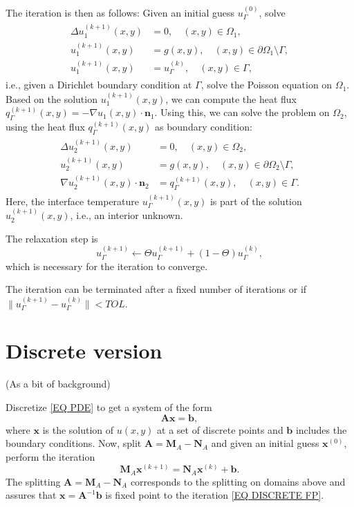 \documentclass[a4paper,10pt]{article}
\begin{document}
The iteration is then as follows: Given an initial guess $u_\Gamma^{(0)}$, solve
% 
\begin{align}
\begin{split}
\Delta u_1^{(k+1)} (x, y) &= 0, \quad (x, y) \in \Omega_1,\\
u^{(k+1)}_1(x, y) &= g(x, y), \quad (x, y) \in \partial \Omega_1\setminus \Gamma, \\
u^{(k+1)}_1(x, y) & = u_\Gamma^{(k)}, \quad (x,y) \in \Gamma,
\end{split}
\end{align}
% 
i.e., given a Dirichlet boundary condition at $\Gamma$, solve the Poisson equation on $\Omega_1$. Based on the solution $u_1^{(k+1)}(x,y)$, we can compute the heat flux $q_\Gamma^{(k+1)}(x, y) = -\nabla u_1 (x, y) \cdot \bm{n}_1$. Using this, we can solve the problem on $\Omega_2$, using the heat flux $q_\Gamma^{(k+1)}(x, y)$ as boundary condition:
% 
\begin{align}
\begin{split}
\Delta u_2^{(k+1)} (x, y) &= 0, \quad (x, y) \in \Omega_2,\\
u^{(k+1)}_2(x, y) &= g(x, y), \quad (x, y) \in \partial \Omega_2\setminus \Gamma, \\
\nabla u^{(k+1)}_2(x, y) \cdot \bm{n}_2 & = q_\Gamma^{(k+1)}(x, y), \quad (x,y) \in \Gamma.
\end{split}
\end{align}
% 
Here, the interface temperature $u_\Gamma^{(k+1)}(x, y)$ is part of the solution $u_2^{(k+1)}(x, y)$, i.e., an interior unknown.

The relaxation step is
% 
\begin{equation}
u_\Gamma^{(k+1)} \gets \Theta u_\Gamma^{(k+1)} + (1 - \Theta)u_\Gamma^{(k)}, 
\end{equation}
% 
which is necessary for the iteration to converge.

The iteration can be terminated after a fixed number of iterations or if $ \| u_\Gamma^{(k+1)} - u_\Gamma^{(k)}\| < TOL$.
% 
\section{Discrete version}
% 
(As a bit of background)

Discretize \eqref{EQ PDE} to get a system of the form
% 
\begin{equation}
\bm{A} \bm{x} = \bm{b},
\end{equation}
% 
where $\bm{x}$ is the solution of $u(x, y)$ at a set of discrete points and $\bm{b}$ includes the boundary conditions. Now, split $\bm{A} = \bm{M}_A - \bm{N}_A$ and given an initial guess $\bm{x}^{(0)}$, perform the iteration 
% 
\begin{equation}\label{EQ DISCRETE FP}
\bm{M}_A \bm{x}^{(k+1)} = \bm{N}_A \bm{x}^{(k)} + \bm{b}.
\end{equation}
% 
The splitting $\bm{A} = \bm{M}_A - \bm{N}_A$ corresponds to the splitting on domains above and assures that $\bm{x} = \bm{A}^{-1}\bm{b}$ is fixed point to the iteration \eqref{EQ DISCRETE FP}.
\end{document}
